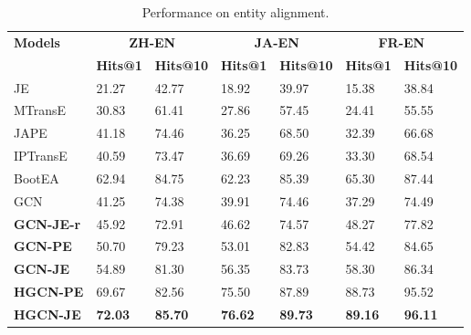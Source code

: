 \documentclass[11pt,a4paper]{article}
\begin{document}
\begin{table}[t!]
	\centering
\scriptsize
	\begin{tabular}{p{38pt}|p{14pt}<{\centering}p{18pt}<{\centering}|p{14pt}<{\centering}p{18pt}<{\centering}|p{14pt}<{\centering}p{18pt}<{\centering}}
		\toprule
		\multirow{2}{*}{\bf Models} & \multicolumn{2}{c|}{\bf ZH-EN} & \multicolumn{2}{c|}{\bf JA-EN} & \multicolumn{2}{c}{ \bf FR-EN}  \\
		& \tiny \bf Hits@1 & \tiny \bf Hits@10 & \tiny \bf Hits@1 &\tiny \bf Hits@10 & \tiny \bf Hits@1 &\tiny \bf Hits@10\\
		\midrule
		JE & 21.27 & 42.77 & 18.92 & 39.97 & 15.38 & 38.84\\
		MTransE & 30.83 & 61.41 & 27.86 & 57.45 & 24.41 & 55.55\\
		JAPE & 41.18 & 74.46 & 36.25 & 68.50 & 32.39 & 66.68 \\
		IPTransE& 40.59 & 73.47 & 36.69 & 69.26 & 33.30 & 68.54 \\
		BootEA  & 62.94 & 84.75 & 62.23 & 85.39 & 65.30 & 87.44 \\
		GCN & 41.25 & 74.38 & 39.91 & 74.46 & 37.29 & 74.49  \\
		\midrule
		\bf GCN-JE-r& 45.92 & 72.91 & 46.62 & 74.57 & 48.27 & 77.82 \\
		\bf GCN-PE & 50.70 & 79.23 & 53.01 & 82.83 & 54.42 & 84.65 \\
		\bf GCN-JE & 54.89 & 81.30 & 56.35 & 83.73 & 58.30 & 86.34\\
		\bf HGCN-PE & 69.67 & 82.56 & 75.50 & 87.89 & 88.73 & 95.52 \\
		\bf HGCN-JE & \bf 72.03 & \bf 85.70 & \bf 76.62 & \bf 89.73 & \bf 89.16 & \bf 96.11 \\
		\bottomrule
	\end{tabular}
	\caption{Performance on entity alignment.}
	\label{Entresults}
\end{table}
\end{document}
